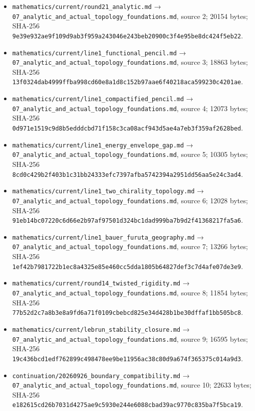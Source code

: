 \documentclass[
  10pt,
]{article}
\begin{document}
\begin{itemize}
  1; 43113 bytes; SHA-256
  \nolinkurl{ca664aa1f07d2907c8bd0b346d4e0b824cb858335fa2a8d15c9cce33ba7e3d54}.
\item
  \nolinkurl{mathematics/current/round21_analytic.md} →
  \nolinkurl{07_analytic_and_actual_topology_foundations.md}, source
  2; 20154 bytes; SHA-256
  \nolinkurl{9e39e932ae9f109d9ab3f959a243046e243beb20900c3f4e95be8dc424f5eb22}.
\item
  \nolinkurl{mathematics/current/line1_functional_pencil.md} →
  \nolinkurl{07_analytic_and_actual_topology_foundations.md}, source
  3; 18863 bytes; SHA-256
  \nolinkurl{13f0324dab4999ffba998cd60e8a1d8c152b97aae6f40218aca599230c4201ae}.
\item
  \nolinkurl{mathematics/current/line1_compactified_pencil.md} →
  \nolinkurl{07_analytic_and_actual_topology_foundations.md}, source
  4; 12073 bytes; SHA-256
  \nolinkurl{0d971e1519c9d8b5edddcbd71f158c3ca08acf943d5ae4a7eb3f359af2628bed}.
\item
  \nolinkurl{mathematics/current/line1_energy_envelope_gap.md} →
  \nolinkurl{07_analytic_and_actual_topology_foundations.md}, source
  5; 10305 bytes; SHA-256
  \nolinkurl{8cd0c429b2f403b1c31bb24333efc7397afba5742394a2951dd56aa5e24c3ad4}.
\item
  \nolinkurl{mathematics/current/line1_two_chirality_topology.md} →
  \nolinkurl{07_analytic_and_actual_topology_foundations.md}, source
  6; 12028 bytes; SHA-256
  \nolinkurl{91eb14bc07220c6d66e2b97af97501d324bc1dad999ba7b9d2f41368217fa5a6}.
\item
  \nolinkurl{mathematics/current/line1_bauer_furuta_geography.md} →
  \nolinkurl{07_analytic_and_actual_topology_foundations.md}, source
  7; 13266 bytes; SHA-256
  \nolinkurl{1ef42b7981722b1ec8a4325e85e460cc5dda1805b64827def3c7d4afe07de3e9}.
\item
  \nolinkurl{mathematics/current/round14_twisted_rigidity.md} →
  \nolinkurl{07_analytic_and_actual_topology_foundations.md}, source
  8; 11854 bytes; SHA-256
  \nolinkurl{77b52d2c7a8b3e8a9fd6a71f0109cbebcd825e34d428b1be30dffaf1bb505bc8}.
\item
  \nolinkurl{mathematics/current/lebrun_stability_closure.md} →
  \nolinkurl{07_analytic_and_actual_topology_foundations.md}, source
  9; 16595 bytes; SHA-256
  \nolinkurl{19c436bcd1edf762899c498478ee9be11956ac38c80d9a674f365375c014a9d3}.
\item
  \nolinkurl{continuation/20260926_boundary_compatibility.md} →
  \nolinkurl{07_analytic_and_actual_topology_foundations.md}, source
  10; 22633 bytes; SHA-256
  \nolinkurl{e182615cd26b7031d4275ae9c5930e244e6088cbad39ac9770c835ba7f5bca19}.

\end{itemize}
\end{document}

